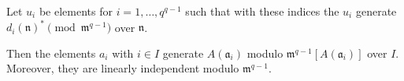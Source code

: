 Let $u_i$ be elements for $i = 1, \dots, q^{q-1}$ such that with these indices the $u_i$ generate $d_i(\mathfrak{n})^* \pmod{\mathfrak{m}^{q-1}}$ over $\mathfrak{n}$.

Then the elements $a_i$ with $i \in I$ generate $A(\mathfrak{a}_i)$ modulo $\mathfrak{m}^{q-1}[A(\mathfrak{a}_i)]$ over $I$. Moreover, they are linearly independent modulo $\mathfrak{m}^{q-1}$.
